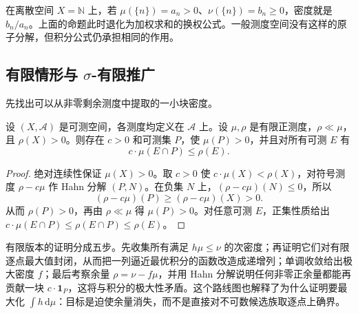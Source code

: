 在离散空间 \(X=\mathbb N\) 上，若 \(\mu(\{n\})=a_n>0\)、\(\nu(\{n\})=b_n\geq0\)，密度就是 \(b_n/a_n\)。上面的命题此时退化为加权求和的换权公式。一般测度空间没有这样的原子分解，但积分公式仍承担相同的作用。

\subsection{有限情形与 \texorpdfstring{\(\sigma\)}{sigma}-有限推广}
\label{b1:subsec:060402}

先找出可以从非零剩余测度中提取的一小块密度。

\begin{lemma}\label{b1:lem:positive-density-minorant}
设 \((X,\mathcal A)\) 是可测空间，各测度均定义在 \(\mathcal A\) 上。设 \(\mu,\rho\) 是有限正测度，\(\rho\ll\mu\)，且 \(\rho(X)>0\)。则存在 \(c>0\) 和可测集 \(P\)，使 \(\mu(P)>0\)，并且对所有可测 \(E\) 有
\[
c\cdot\mu(E\cap P)\leq\rho(E).
\]
\end{lemma}
\begin{proof}
绝对连续性保证 \(\mu(X)>0\)。取 \(c>0\) 使 \(c\cdot\mu(X)<\rho(X)\)，对符号测度 \(\rho-c\mu\) 作 Hahn 分解 \((P,N)\)。在负集 \(N\) 上，\((\rho-c\mu)(N)\leq0\)，所以
\[
(\rho-c\mu)(P)\geq(\rho-c\mu)(X)>0.
\]
从而 \(\rho(P)>0\)，再由 \(\rho\ll\mu\) 得 \(\mu(P)>0\)。对任意可测 \(E\)，正集性质给出 \(c\cdot\mu(E\cap P)\leq\rho(E\cap P)\leq\rho(E)\)。
\end{proof}

有限版本的证明分成五步。先收集所有满足 \(h\mu\leq\nu\) 的次密度；再证明它们对有限逐点最大值封闭，从而把一列逼近最优积分的函数改造成递增列；单调收敛给出极大密度 \(f\)；最后考察余量 \(\rho=\nu-f\mu\)，并用 Hahn 分解说明任何非零正余量都能再贡献一块 \(c\cdot\mathbf1_P\)，这将与积分的极大性矛盾。这个路线图也解释了为什么证明要最大化 \(\int h\,\mathrm d\mu\)：目标是迫使余量消失，而不是直接对不可数候选族取逐点上确界。

